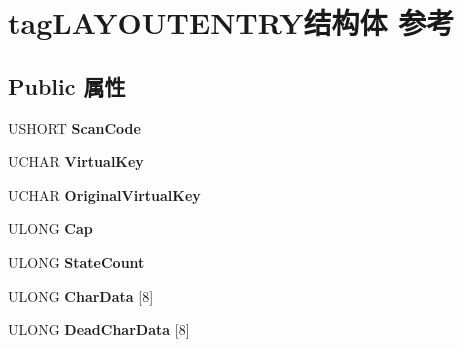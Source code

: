 \hypertarget{structtag_l_a_y_o_u_t_e_n_t_r_y}{}\section{tag\+L\+A\+Y\+O\+U\+T\+E\+N\+T\+R\+Y结构体 参考}
\label{structtag_l_a_y_o_u_t_e_n_t_r_y}
\subsection*{Public 属性}
\begin{DoxyCompactItemize}
\item 
\mbox{\label{structtag_l_a_y_o_u_t_e_n_t_r_y_ab7ef04e0fcf9d4f26f4246a43fe43ae3}} 
U\+S\+H\+O\+RT {\bfseries Scan\+Code}
\item 
\mbox{\label{structtag_l_a_y_o_u_t_e_n_t_r_y_a7f81b86ef48464cc7e7810f94c887b42}} 
U\+C\+H\+AR {\bfseries Virtual\+Key}
\item 
\mbox{\label{structtag_l_a_y_o_u_t_e_n_t_r_y_ac0c0d63a09c54de6150ee92a12e4070c}} 
U\+C\+H\+AR {\bfseries Original\+Virtual\+Key}
\item 
\mbox{\label{structtag_l_a_y_o_u_t_e_n_t_r_y_a2b382624332574b75f293698e8763e4e}} 
U\+L\+O\+NG {\bfseries Cap}
\item 
\mbox{\label{structtag_l_a_y_o_u_t_e_n_t_r_y_afc963723d02e5b8aab12449a4a752f12}} 
U\+L\+O\+NG {\bfseries State\+Count}
\item 
\mbox{\label{structtag_l_a_y_o_u_t_e_n_t_r_y_a146fd3bf96f9a3ebd7137176e2b8508d}} 
U\+L\+O\+NG {\bfseries Char\+Data} \mbox{[}8\mbox{]}
\item 
\mbox{\label{structtag_l_a_y_o_u_t_e_n_t_r_y_a4e4434470982ae4b2ed010d53ee870d1}} 
U\+L\+O\+NG {\bfseries Dead\+Char\+Data} \mbox{[}8\mbox{]}
\item 
\mbox{\label{structtag_l_a_y_o_u_t_e_n_t_r_y_aec5c8ac07a4b34aa0055e7bd640dc1ea}} 

\end{DoxyCompactItemize}
